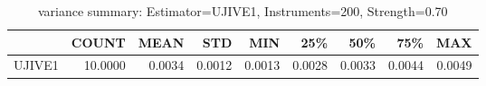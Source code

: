 \begin{table}[ht]
\centering
\caption{variance summary: Estimator=UJIVE1, Instruments=200, Strength=0.70}
\begin{tabular}{lrrrrrrrr}
\toprule
 & COUNT & MEAN & STD & MIN & 25\% & 50\% & 75\% & MAX \\
\midrule
UJIVE1 & 10.0000 & 0.0034 & 0.0012 & 0.0013 & 0.0028 & 0.0033 & 0.0044 & 0.0049 \\
\bottomrule
\end{tabular}
\end{table}

